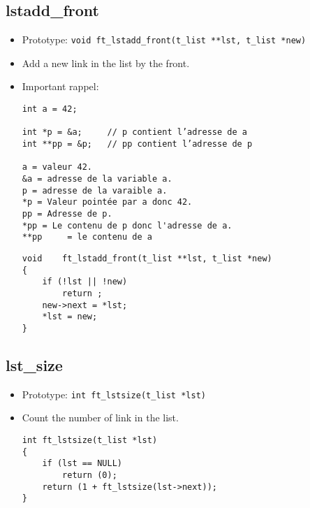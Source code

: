 \documentclass{article}
\begin{document}
		\subsection{lstadd\_front}
			\begin{itemize}[label=$\rightarrow$]
				\item Prototype: \texttt{void	ft\_lstadd\_front(t\_list **lst, t\_list *new)}
				\item Add a new link in the list by the front.
				\item Important rappel:
				\begin{verbatim}
int a = 42;

int *p = &a;     // p contient l’adresse de a
int **pp = &p;   // pp contient l’adresse de p

a = valeur 42.
&a = adresse de la variable a.
p = adresse de la varaible a.
*p = Valeur pointée par a donc 42.
pp = Adresse de p.
*pp = Le contenu de p donc l'adresse de a.
**pp	 = le contenu de a
				\end{verbatim}
				\begin{verbatim}
void	ft_lstadd_front(t_list **lst, t_list *new)
{
	if (!lst || !new)
		return ;
	new->next = *lst;
	*lst = new;
}
				\end{verbatim}
			\end{itemize}
	
		\subsection{lst\_size}
			\begin{itemize}[label=$\rightarrow$]
				\item Prototype: \texttt{int ft\_lstsize(t\_list *lst) }
				\item Count the number of link in the list.
				\begin{verbatim}
int ft_lstsize(t_list *lst)                                                     
{                                                                               
    if (lst == NULL)                                                            
        return (0);                                                             
    return (1 + ft_lstsize(lst->next));                                         
}  
				\end{verbatim}
			\end{itemize}
		
\end{document}
